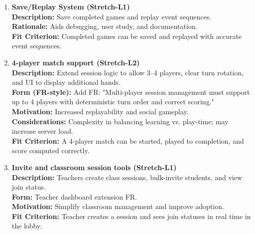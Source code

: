 \documentclass[12pt]{article}
\begin{document}
\begin{enumerate}
  \item \textbf{Save/Replay System (Stretch-L1)}\\
  \textbf{Description:} Save completed games and replay event sequences.\\
  \textbf{Rationale:} Aids debugging, user study, and documentation.\\
  \textbf{Fit Criterion:} Completed games can be saved and replayed with accurate event sequences.
  
  \item \textbf{4-player match support (Stretch-L2)}\\
  \textbf{Description:} Extend session logic to allow 3--4 players, clear turn rotation, and UI to display additional hands.\\
  \textbf{Form (FR-style):} Add FR: "Multi-player session management must support up to 4 players with deterministic turn order and correct scoring."\\
  \textbf{Motivation:} Increased replayability and social gameplay.\\
  \textbf{Considerations:} Complexity in balancing learning vs. play-time; may increase server load.\\
  \textbf{Fit Criterion:} A 4-player match can be started, played to completion, and score computed correctly.
  
  \item \textbf{Invite and classroom session tools (Stretch-L1)}\\
  \textbf{Description:} Teachers create class sessions, bulk-invite students, and view join status.\\
  \textbf{Form:} Teacher dashboard extension FR.\\
  \textbf{Motivation:} Simplify classroom management and improve adoption.\\
  \textbf{Fit Criterion:} Teacher creates a session and sees join statuses in real time in the lobby.
\end{enumerate}
\end{document}
